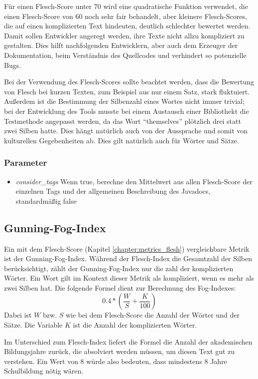 Für einen Flesch-Score unter 70 wird eine quadratische Funktion verwendet, die einen Flesch-Score von 60 noch sehr fair behandelt, aber kleinere Flesch-Scores, die auf einen komplizierten Text hindeuten, deutlich schlechter bewertet werden. Damit sollen Entwickler angeregt werden, ihre Texte nicht allzu kompliziert zu gestalten. Dies hilft nachfolgenden Entwicklern, aber auch dem Erzeuger der Dokumentation, beim Verständnis des Quellcodes und verhindert so potenzielle Bugs.

Bei der Verwendung des Flesch-Scores sollte beachtet werden, dass die Bewertung von Flesch bei kurzen Texten, zum Beispiel aus nur einem Satz, stark fluktuiert. Außerdem ist die Bestimmung der Silbenzahl eines Wortes nicht immer trivial; bei der Entwicklung des Tools musste bei einem Austausch einer Bibliothekt die Testmethode angepasst werden, da das Wort \enquote{themselves} plötzlich drei statt zwei Silben hatte. Dies hängt natürlich auch von der Aussprache und somit von kulturellen Gegebenheiten ab. Dies gilt natürlich auch für Wörter und Sätze. 
\subsubsection{Parameter}
\begin{itemize}
    \item \textit{consider\_tags} Wenn true, berechne den Mittelwert aus allen Flesch-Score der einzelnen Tags und der allgemeinen Beschreibung des Javadocs, standardmäßig false
\end{itemize}

\subsection{Gunning-Fog-Index}\label{chapter:metric_gunning_fog}
Ein mit dem Flesch-Score (Kapitel \ref{chapter:metrics_flesh}) vergleichbare Metrik ist der Gunning-Fog-Index. Während der Flesch-Index die Gesamtzahl der Silben berücksichtigt, zählt der Gunning-Fog-Index nur die zahl der komplizierten Wörter. Ein Wort gilt im Kontext dieser Metrik als kompliziert, wenn es mehr als zwei Silben hat. Die folgende Formel dient zur Berechnung des Fog-Indexes:
\begin{equation}
    0.4*(\frac{W}{S}+\frac{K}{100})
\end{equation}
Dabei ist $W$ bzw. $S$ wie bei dem Flesch-Score die Anzahl der Wörter und der Sätze. Die Variable $K$ ist die Anzahl der komplizierten Wörter. 

Im Unterschied zum Flesch-Index liefert die Formel die Anzahl der akademischen Bildungsjahre zurück, die absolviert werden müssen, um diesen Text gut zu verstehen. Ein Wert von 8 würde also bedeuten, dass mindestens 8 Jahre Schulbildung nötig wären\cite[S. 24]{ThePrinciplesofReadability}. 

